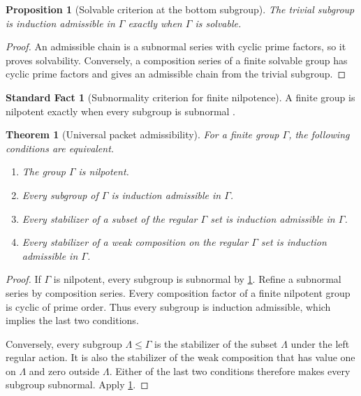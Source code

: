 \documentclass{aomart}
\newtheorem{theorem}{Theorem}[section]
\newtheorem{proposition}[proposition]{Proposition}
\theoremstyle{definition}
\newtheorem{standardfact}[standardfact]{Standard Fact}
\theoremstyle{remark}
\begin{document}
\begin{proposition}[Solvable criterion at the bottom subgroup]\label{prop:solvable_bottom}
The trivial subgroup is induction admissible in \(\Gamma\) exactly when \(\Gamma\) is solvable.
\end{proposition}

\begin{proof}
An admissible chain is a subnormal series with cyclic prime factors, so it proves solvability. Conversely, a composition series of a finite solvable group has cyclic prime factors and gives an admissible chain from the trivial subgroup.
\end{proof}

\begin{standardfact}[Subnormality criterion for finite nilpotence]\label{fact:subnormal_nilpotent}
A finite group is nilpotent exactly when every subgroup is subnormal \cite{Isaacs1976,Robinson1996}.
\end{standardfact}

\begin{theorem}[Universal packet admissibility]\label{thm:universal_packet_admissibility}
For a finite group \(\Gamma\), the following conditions are equivalent.

\begin{enumerate}
\item The group \(\Gamma\) is nilpotent.
\item Every subgroup of \(\Gamma\) is induction admissible in \(\Gamma\).
\item Every stabilizer of a subset of the regular \(\Gamma\) set is induction admissible in \(\Gamma\).
\item Every stabilizer of a weak composition on the regular \(\Gamma\) set is induction admissible in \(\Gamma\).
\end{enumerate}
\end{theorem}

\begin{proof}
If \(\Gamma\) is nilpotent, every subgroup is subnormal by \cref{fact:subnormal_nilpotent}. Refine a subnormal series by composition series. Every composition factor of a finite nilpotent group is cyclic of prime order. Thus every subgroup is induction admissible, which implies the last two conditions.

Conversely, every subgroup \(\Lambda\leq\Gamma\) is the stabilizer of the subset \(\Lambda\) under the left regular action. It is also the stabilizer of the weak composition that has value one on \(\Lambda\) and zero outside \(\Lambda\). Either of the last two conditions therefore makes every subgroup subnormal. Apply \cref{fact:subnormal_nilpotent}.
\end{proof}
\end{document}
